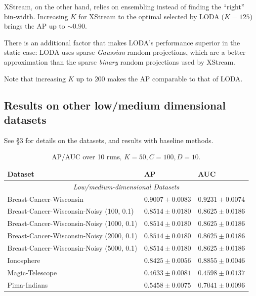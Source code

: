 \documentclass[11pt,onecolumn]{article}
\begin{document}
XStream, on the other hand, relies on ensembling instead of finding the ``right'' bin-width. Increasing $K$ for XStream to the optimal selected by LODA ($K = 125$) brings the AP up to $\sim0.90$.

There is an additional factor that makes LODA's performance superior in the static case: LODA uses sparse \textit{Gaussian} random projections, which are a better approximation than the sparse \textit{binary} random projections used by XStream.

Note that increasing $K$ up to $200$ makes the AP comparable to that of LODA.

\pagebreak

\subsection{Results on other low/medium dimensional datasets}

See \S3 for details on the datasets, and results with baseline methods.

\begin{table}[ht!]
    \centering
		\begin{tabular}{lll}
				\toprule
				\textbf{Dataset} & \textbf{AP} & \textbf{AUC}\\
				\midrule
				\multicolumn{3}{c}{\textit{Low/medium-dimensional Datasets}}\\
				Breast-Cancer-Wisconsin & $0.9007 \pm 0.0083$ & $0.9231 \pm 0.0074$\\
				Breast-Cancer-Wisconsin-Noisy (100, 0.1) & $0.8514 \pm 0.0180$ & $0.8625 \pm 0.0186$\\
				Breast-Cancer-Wisconsin-Noisy (1000, 0.1) & $0.8514 \pm 0.0180$ & $0.8625 \pm 0.0186$\\
				Breast-Cancer-Wisconsin-Noisy (2000, 0.1) & $0.8514 \pm 0.0180$ & $0.8625 \pm 0.0186$\\
				Breast-Cancer-Wisconsin-Noisy (5000, 0.1) & $0.8514 \pm 0.0180$ & $0.8625 \pm 0.0186$\\
				\midrule
				Ionosphere & $0.8425 \pm 0.0056$ & $0.8855 \pm 0.0046$\\
				\midrule
				Magic-Telescope & $0.4633 \pm 0.0081$ & $0.4598 \pm 0.0137$\\
				\midrule
				Pima-Indians & $0.5458 \pm 0.0075$ & $0.7041 \pm 0.0096$\\
				\bottomrule
		\end{tabular}
		\caption{AP/AUC over 10 runs, $K=50, C=100, D=10$.}
\end{table}



\printbibliography
\end{document}
